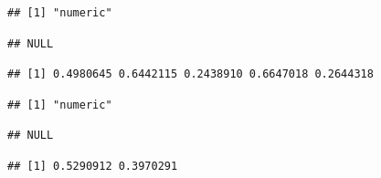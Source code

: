 \documentclass[krantz2]{krantz}\usepackage{knitr}%
\begin{document}
\begin{knitrout}\footnotesize
{}\color{fgcolor}\begin{kframe}
\begin{alltt}
\hlstd{(}\hlstd{)}
 \hlkwb{<-} \hlstd{(}\hlstd{(}\hlstd{),}  \hlstd{=} \hlstd{)}
 \hlkwb{<-} \hlstd{(}   \hlstd{=} \hlstd{,}    \hlstd{=} \hlstd{)}
\end{alltt}
\begin{verbatim}
## [1] "numeric"
\end{verbatim}
\begin{alltt}
\end{alltt}
\begin{verbatim}
## NULL
\end{verbatim}
\begin{alltt}
\end{alltt}
\begin{verbatim}
## [1] 0.4980645 0.6442115 0.2438910 0.6647018 0.2644318
\end{verbatim}
\begin{alltt}
 \hlkwb{<-} \hlstd{(}   \hlstd{=} \hlstd{,}    \hlstd{=} \hlstd{)}
\end{alltt}
\begin{verbatim}
## [1] "numeric"
\end{verbatim}
\begin{alltt}
\end{alltt}
\begin{verbatim}
## NULL
\end{verbatim}
\begin{alltt}
\end{alltt}
\begin{verbatim}
## [1] 0.5290912 0.3970291
\end{verbatim}
\end{kframe}
\end{knitrout}
\end{document}

